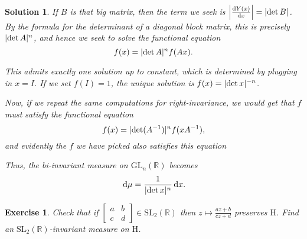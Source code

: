 \documentclass{article}
\newtheorem{ex}{Exercise}
\theoremstyle{nonumberplain}
\newtheorem{sol}{Solution}
\newcommand{\R}{\mathbb{R}}
\newcommand{\GL}{\mathrm{GL}}
\newcommand{\SL}{\mathrm{SL}}
\newcommand{\Hp}{\mathrm{H}}
\DeclarePairedDelimiter{\abs}{\lvert}{\rvert}
\begin{document}
\begin{sol}
If $B$ is that big matrix, then the term we seek is $\abs*{\diff{Y(x)}x} = \abs{\det B}$. By the formula for the determinant of a diagonal block matrix, this is precisely $\abs{\det A}^n$, and hence we seek to solve the functional equation
\begin{equation}
f(x) = \abs{\det A}^n f(Ax).
\end{equation}

This admits exactly one solution up to constant, which is determined by plugging in $x = I$. If we set $f(I) = 1$, the unique solution is $f(x) = \abs{\det x}^{-n}$.

Now, if we repeat the same computations for right-invariance, we would get that $f$ must satisfy the functional equation
\begin{equation}
f(x) = \abs{\det(A^{-1})}^n f(x A^{-1}),
\end{equation}
and evidently the $f$ we have picked also satisfies this equation

Thus, the bi-invariant measure on $\GL_n(\R)$ becomes
\begin{equation}
\dl\mu = \frac1{\abs{\det x}^n} \dl x.
\end{equation}
\end{sol}

\begin{ex}
Check that if $\left[\begin{smallmatrix} a & b \\ c & d \end{smallmatrix}\right] \in \SL_2(\R)$ then $z \mapsto \frac{az+b}{cz+d}$ preserves $\Hp$. Find an $\SL_2(\R)$-invariant measure on $\Hp$.
\end{ex}
\end{document}
